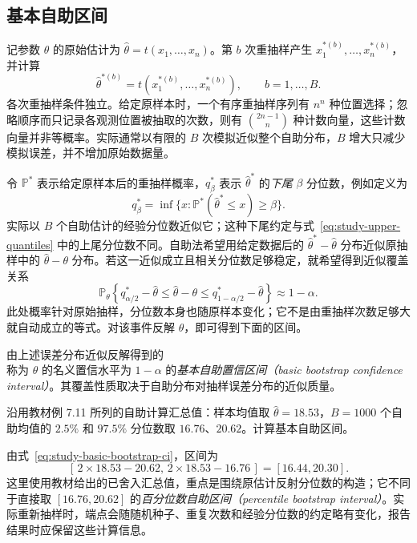 \subsection{基本自助区间}
\label{subsec:study-basic-bootstrap-ci}

记参数 $\theta$ 的原始估计为 $\widehat\theta=t(x_1,\ldots,x_n)$。第 $b$ 次重抽样产生 $x_1^{*(b)},\ldots,x_n^{*(b)}$，并计算
\[
  \widehat\theta^{*(b)}
   =t(x_1^{*(b)},\ldots,x_n^{*(b)}),\qquad b=1,\ldots,B.
\]
各次重抽样条件独立。给定原样本时，一个有序重抽样序列有 $n^n$ 种位置选择；忽略顺序而只记录各观测位置被抽取的次数，则有 $\binom{2n-1}{n}$ 种计数向量，这些计数向量并非等概率。实际通常以有限的 $B$ 次模拟近似整个自助分布，$B$ 增大只减少模拟误差，并不增加原始数据量。

令 $\mathbb P^*$ 表示给定原样本后的重抽样概率，$q_\beta^*$ 表示 $\widehat\theta^*$ 的\emph{下尾} $\beta$ 分位数，例如定义为
\[
  q_\beta^*=\inf\{x:\mathbb P^*(\widehat\theta^*\le x)\ge\beta\}.
\]
实际以 $B$ 个自助估计的经验分位数近似它；这种下尾约定与式~\eqref{eq:study-upper-quantiles} 中的上尾分位数不同。自助法希望用给定数据后的 $\widehat\theta^*-\widehat\theta$ 分布近似原抽样中的 $\widehat\theta-\theta$ 分布。若这一近似成立且相关分位数足够稳定，就希望得到近似覆盖关系
\[
  \mathbb P_\theta\left\{
    q_{\alpha/2}^*-\widehat\theta
    \le\widehat\theta-\theta
    \le q_{1-\alpha/2}^*-\widehat\theta
  \right\}\approx1-\alpha.
\]
此处概率针对原始抽样，分位数本身也随原样本变化；它不是由重抽样次数足够大就自动成立的等式。对该事件反解 $\theta$，即可得到下面的区间。

\begin{definition}
\label{def:study-basic-bootstrap-ci}
由上述误差分布近似反解得到的
\begin{equation}
  [\,2\widehat\theta-q_{1-\alpha/2}^*,\,
      2\widehat\theta-q_{\alpha/2}^*\,]
  \label{eq:study-basic-bootstrap-ci}
\end{equation}
称为 $\theta$ 的名义置信水平为 $1-\alpha$ 的\emph{基本自助置信区间（basic bootstrap confidence interval）}。其覆盖性质取决于自助分布对抽样误差分布的近似质量。
\end{definition}

\begin{example}
\label{ex:study-basic-bootstrap-summary}
沿用教材例 7.11 所列的自助计算汇总值：样本均值取 $\widehat\theta=18.53$，$B=1000$ 个自助均值的 $2.5\%$ 和 $97.5\%$ 分位数取 $16.76$、$20.62$。计算基本自助区间。
\end{example}
\begin{solve}
由式~\eqref{eq:study-basic-bootstrap-ci}，区间为
\[
  [\,2\times18.53-20.62,\,2\times18.53-16.76\,]
  =[16.44,20.30].
\]
这里使用教材给出的已舍入汇总值，重点是围绕原估计反射分位数的构造；它不同于直接取 $[16.76,20.62]$ 的\emph{百分位数自助区间（percentile bootstrap interval）}。实际重新抽样时，端点会随随机种子、重复次数和经验分位数的约定略有变化，报告结果时应保留这些计算信息。
\end{solve}

